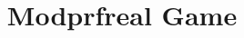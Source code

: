 \documentclass[a4paper,landscape]{article}
\title{Modprfreal Game}
\begin{document}
\maketitle
\begin{center}

\end{center}
\begin{center}

\end{center}
\begin{center}

\end{center}
\end{document}
